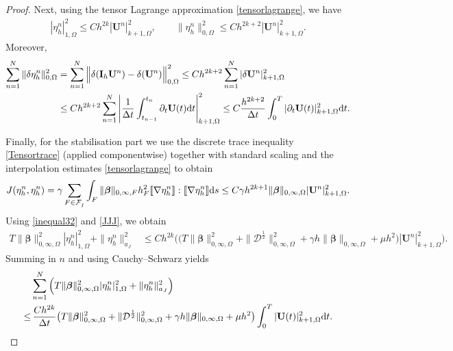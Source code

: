 \documentclass[final,12pt]{amsart}
\theoremstyle{plain}
\theoremstyle{definition}
\newcommand\bbeta{{\boldsymbol{\beta}}}
\newcommand\calF{\mathcal{F}}
\newcommand\bU{\mathbf{U}}
\begin{document}
\begin{proof}
Next, using the tensor Lagrange approximation \eqref{tensorlagrange}, we have
\begin{align}
	|\eta^{n}_{h}|_{1,\Omega}^{2}\leq Ch^{2k}|\bU^{n} |_{k+1,\Omega}^{2},
	\qquad
	\|\eta^n_h\|_{0,\Omega}^2\le C  h^{2k+2}|\bU^n|_{k+1,\Omega}^{2}.\label{inequal32}
\end{align}
Moreover,
\begin{equation}
	\begin{aligned}
		\sum_{n=1}^{N}\|\delta \eta_{h}^{n}\|_{0,\Omega}^{2}
		&=\sum_{n=1}^{N}\Big\|\delta (\mathbf{I}_h\bU^{n})-\delta(\bU^{n})\Big\|_{0,\Omega}^{2}
		\leq Ch^{2k+2}\sum_{n=1}^{N}|\delta \mathbf{U}^{n} |_{k+1,\Omega}^{2}\\
		&\leq C h^{2k+2}\sum_{n=1}^{N}\left|\frac{1}{\Delta t}\int_{t_{n-1}}^{t_{n}}\partial_{t} \mathbf{U}(t) {\rm d}t\right|_{k+1,\Omega}^{2}
		\leq C\frac{h^{2k+2}}{\Delta t}\int_{0}^{T}|\partial_{t}\mathbf{U}(t)|_{k+1,\Omega}^{2}{\rm d}t.
	\end{aligned}
\end{equation}

Finally, for the stabilisation part we use the discrete trace inequality \eqref{Tensortrace} (applied componentwise) together with standard scaling and the interpolation estimates \eqref{tensorlagrange} to obtain
\begin{align}
	J(\eta_{h}^{n},\eta_{h}^{n})
	= \gamma \sum_{F\in\calF_I^{}}\int_F\|\bbeta \|_{0,\infty,F}  h_{F}^{2} \llbracket\nabla \eta_{h}^{n} \rrbracket :\llbracket\nabla \eta_{h}^{n} \rrbracket  {\rm d}s
	\leq C\gamma h^{2k+1}\|\bbeta\|_{0,\infty,\Omega} |\bU^{n} |_{k+1,\Omega}^{2}.\label{JJJ}
\end{align}
Using \eqref{inequal32} and \eqref{JJJ}, we obtain
\begin{equation}
	\begin{aligned}
		T\|\bbeta\|_{0,\infty,\Omega}^{2} |\eta^{n}_{h}|_{1,\Omega}^{2}
		+\|\eta^{n}_{h}\|_{a_J}^{2}
		&\leq Ch^{2k}\Big(\big(T\|\bbeta\|_{0,\infty,\Omega}^{2}
		+\|\mathcal{D}^{\frac{1}{2}}\|_{0,\infty,\Omega}^{2}
		+\gamma h\|\bbeta\|_{0,\infty,\Omega}
		+\mu h^{2}\big) |\mathbf{U}^{n}|_{k+1,\Omega}^{2}\Big).
	\end{aligned}
\end{equation}
Summing in $n$ and using Cauchy--Schwarz yields
\begin{align}\label{eq:summed_interp_bound}
		&\sum_{n=1}^{N}\Big(T\|\bbeta\|_{0,\infty,\Omega}^{2} |\eta^{n}_{h}|_{1,\Omega}^{2}
		+\|\eta^{n}_{h}\|_{a_J}^{2}\Big) \nonumber\\
		\leq&\,  \frac{Ch^{2k}}{\Delta t}\big(T\|\bbeta\|_{0,\infty,\Omega}^{2}
		+\|\mathcal{D}^{\frac{1}{2}}\|_{0,\infty,\Omega}^{2}
		+\gamma h\|\bbeta\|_{0,\infty,\Omega}
		+\mu h^{2}\big)\int_{0}^{T}|\mathbf{U}(t)|_{k+1,\Omega}^{2}{\rm d}t.
\end{align}


\end{proof}
\end{document}
